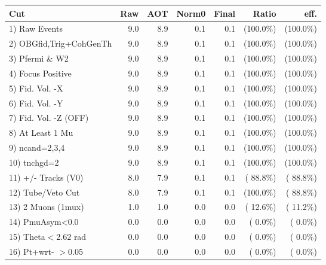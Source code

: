  \begin{table}[h!]\centering
 \begin{tabular}{||l||r|r|r|r|r|r||}
 \hline
 \hline
 Cut & Raw & AOT & Norm0 & Final & Ratio & eff.       \\
 \hline
  1) Raw Events           &          9.0 &          8.9 &          0.1 &          0.1 & (100.0\%) & (100.0\%) \\
  2) OBGfid,Trig+CohGenTh &          9.0 &          8.9 &          0.1 &          0.1 & (100.0\%) & (100.0\%) \\
  3) Pfermi \& W2         &          9.0 &          8.9 &          0.1 &          0.1 & (100.0\%) & (100.0\%) \\
  4) Focus Positive       &          9.0 &          8.9 &          0.1 &          0.1 & (100.0\%) & (100.0\%) \\
  5) Fid. Vol. -X         &          9.0 &          8.9 &          0.1 &          0.1 & (100.0\%) & (100.0\%) \\
  6) Fid. Vol. -Y         &          9.0 &          8.9 &          0.1 &          0.1 & (100.0\%) & (100.0\%) \\
  7) Fid. Vol. -Z (OFF)   &          9.0 &          8.9 &          0.1 &          0.1 & (100.0\%) & (100.0\%) \\
  8) At Least 1 Mu        &          9.0 &          8.9 &          0.1 &          0.1 & (100.0\%) & (100.0\%) \\
  9) ncand=2,3,4          &          9.0 &          8.9 &          0.1 &          0.1 & (100.0\%) & (100.0\%) \\
 10) tnchgd=2             &          9.0 &          8.9 &          0.1 &          0.1 & (100.0\%) & (100.0\%) \\
 11) +/- Tracks (V0)      &          8.0 &          7.9 &          0.1 &          0.1 & ( 88.8\%) & ( 88.8\%) \\
 12) Tube/Veto Cut        &          8.0 &          7.9 &          0.1 &          0.1 & (100.0\%) & ( 88.8\%) \\
 13) 2 Muons (1mux)       &          1.0 &          1.0 &          0.0 &          0.0 & ( 12.6\%) & ( 11.2\%) \\
 14) PmuAsym<0.0          &          0.0 &          0.0 &          0.0 &          0.0 & (  0.0\%) & (  0.0\%) \\
 15) Theta$<$2.62 rad     &          0.0 &          0.0 &          0.0 &          0.0 & (  0.0\%) & (  0.0\%) \\
 16) Pt+wrt- $>$0.05      &          0.0 &          0.0 &          0.0 &          0.0 & (  0.0\%) & (  0.0\%) \\

\end{tabular}
\end{table}
